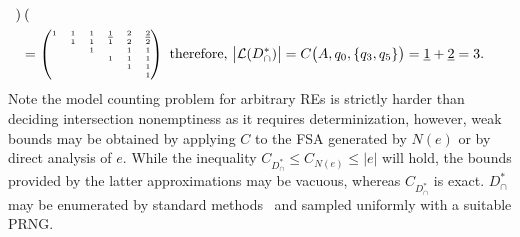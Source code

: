 \documentclass[popl.tex]{subfiles}
\begin{document}
\begin{align}
\begin{tiny}
\begin{pmatrix}
  \end{pmatrix}\end{tiny}\\
  &= \begin{tiny}\begin{pmatrix}
    1   & 1  & 1  & \underline{1} & 2 & \underline{2} \\
        & 1  & 1  & 1 & 2 & 2 \\
        &    & 1  &   & 1 & 1 \\
        &    &    & 1 & 1 & 1 \\
        &    &    &   & 1 & 1 \\
        &    &    &   &   & 1 \\
\end{pmatrix}\end{tiny} \text{ therefore, } \big|\mathcal{L}(D_\cap^*)\big| = C\big(A, q_0, \{q_3, q_5\}\big) = \underline{1} + \underline{2} = 3.
\end{align}
Note the model counting problem for arbitrary REs is strictly harder than deciding intersection nonemptiness as it requires determinization, however, weak bounds may be obtained by applying $C$ to the FSA generated by $N(e)$ or by direct analysis of $e$. While the inequality $C_{D_\cap^*} \leq C_{N(e)} \leq |e|$ will hold, the bounds provided by the latter approximations may be vacuous, whereas $C_{D_\cap^*}$ is exact. $D_\cap^*$ may be enumerated by standard methods~\cite{flajolet2009analytic} and sampled uniformly with a suitable PRNG.
\ifSubfilesClassLoaded{\par\clearpage}{}
\end{document}
